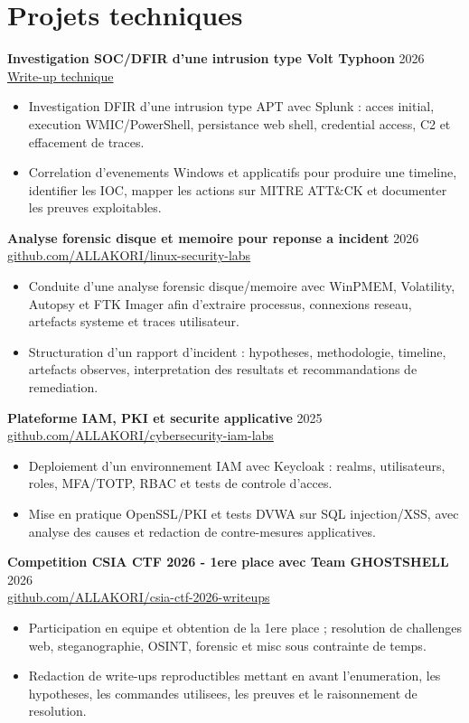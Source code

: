 \documentclass[10pt,a4paper]{article}
\newcommand{\entryspace}{\vspace{5pt}}
\begin{document}
\section{Projets techniques}
\textbf{Investigation SOC/DFIR d'une intrusion type Volt Typhoon} \hfill 2026\\
\href{https://allakori.github.io/writeups/posts/volt-typhoon-intrusion/}{Write-up technique}
\begin{itemize}
  \item Investigation DFIR d'une intrusion type APT avec Splunk : acces initial, execution WMIC/PowerShell, persistance web shell, credential access, C2 et effacement de traces.
  \item Correlation d'evenements Windows et applicatifs pour produire une timeline, identifier les IOC, mapper les actions sur MITRE ATT\&CK et documenter les preuves exploitables.
\end{itemize}
\entryspace

\textbf{Analyse forensic disque et memoire pour reponse a incident} \hfill 2026\\
\href{https://github.com/ALLAKORI/linux-security-labs}{github.com/ALLAKORI/linux-security-labs}
\begin{itemize}
  \item Conduite d'une analyse forensic disque/memoire avec WinPMEM, Volatility, Autopsy et FTK Imager afin d'extraire processus, connexions reseau, artefacts systeme et traces utilisateur.
  \item Structuration d'un rapport d'incident : hypotheses, methodologie, timeline, artefacts observes, interpretation des resultats et recommandations de remediation.
\end{itemize}
\entryspace

\textbf{Plateforme IAM, PKI et securite applicative} \hfill 2025\\
\href{https://github.com/ALLAKORI/cybersecurity-iam-labs}{github.com/ALLAKORI/cybersecurity-iam-labs}
\begin{itemize}
  \item Deploiement d'un environnement IAM avec Keycloak : realms, utilisateurs, roles, MFA/TOTP, RBAC et tests de controle d'acces.
  \item Mise en pratique OpenSSL/PKI et tests DVWA sur SQL injection/XSS, avec analyse des causes et redaction de contre-mesures applicatives.
\end{itemize}
\entryspace

\textbf{Competition CSIA CTF 2026 - 1ere place avec Team GHOSTSHELL} \hfill 2026\\
\href{https://github.com/ALLAKORI/csia-ctf-2026-writeups}{github.com/ALLAKORI/csia-ctf-2026-writeups}
\begin{itemize}
  \item Participation en equipe et obtention de la 1ere place ; resolution de challenges web, steganographie, OSINT, forensic et misc sous contrainte de temps.
  \item Redaction de write-ups reproductibles mettant en avant l'enumeration, les hypotheses, les commandes utilisees, les preuves et le raisonnement de resolution.
\end{itemize}
\entryspace
\end{document}
